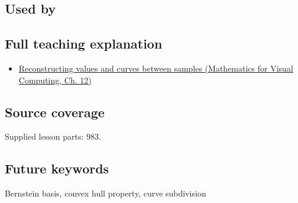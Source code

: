 \subsection{Used by}\label{appendix-ddbec701898c-used-by}

\subsection{Full teaching explanation}\label{appendix-ddbec701898c-full-teaching-explanation}

\begin{itemize}
\tightlist
\item
  \href{../02-Mathematics-for-Visual-Computing/main.pdf\#nameddest=02-foundations-ii-ch028-reconstructing-values-and-curves-between-samples}{Reconstructing values and curves between samples (Mathematics for Visual Computing, Ch. 12)}
\end{itemize}

\subsection{Source coverage}\label{appendix-ddbec701898c-source-coverage}

Supplied lesson parts: 983.

\subsection{Future keywords}\label{appendix-ddbec701898c-future-keywords}

Bernstein basis, convex hull property, curve subdivision
